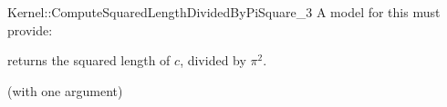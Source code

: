 \begin{ccRefFunctionObjectConcept}{Kernel::ComputeSquaredLengthDividedByPiSquare_3}
A model for this must provide:


       {returns the squared length of $c$, divided by $\pi^2$. }

\ccRefines
{} (with one argument)

\ccSeeAlso
{} \\

\end{ccRefFunctionObjectConcept}
